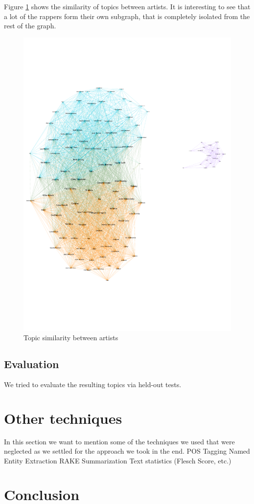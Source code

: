 \documentclass[10pt,a4paper]{article}
\begin{document}
		Figure \ref{fig:topicsimilarity} shows the similarity of topics between artists. It is interesting to see that a lot of the rappers form their own subgraph, that is completely isolated from the rest of the graph.
		
		\begin{figure}[htb]
			\centering
			\includegraphics[trim=0mm 50mm 0mm 50mm, clip, width=\linewidth]{data/topic_similarity}
				\caption{Topic similarity between artists}
				\label{fig:topicsimilarity}
		\end{figure}
		
		\subsection{Evaluation}
		We tried to evaluate the resulting topics via held-out tests.
	
	\section{Other techniques}
	\label{sec:othertechniques}
	In this section we want to mention some of the techniques we used that were neglected as we settled for the approach we took in the end.
	POS Tagging
	Named Entity Extraction
	RAKE
	Summarization
	Text statistics (Flesch Score, etc.)

	\section{Conclusion}
	\label{sec:conclusion}
	
	\newpage
	
	
	
	
\end{document}
